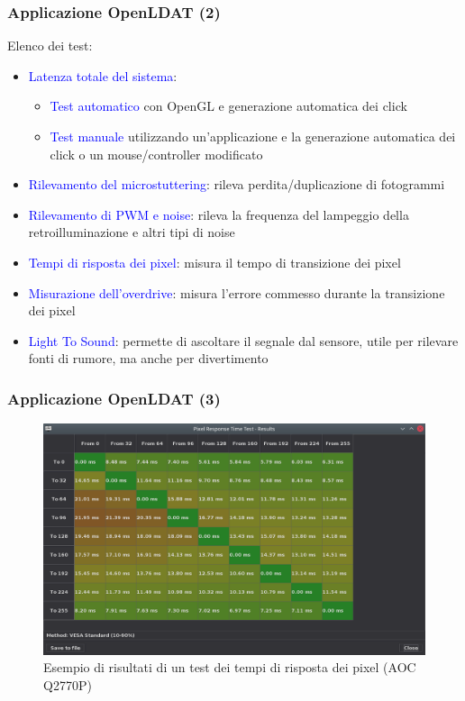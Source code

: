 \documentclass{beamer}
\begin{document}
\begin{frame}[shrink=7]
	\frametitle{Applicazione OpenLDAT (2)}
	Elenco dei test:\begin{itemize}
		\item \textcolor{blue}{Latenza totale del sistema}:\begin{itemize}
			\item \textcolor{blue}{Test automatico} con OpenGL e generazione automatica dei click
			\item \textcolor{blue}{Test manuale} utilizzando un'applicazione e la generazione automatica dei click o un mouse/controller modificato
		\end{itemize}
		\item \textcolor{blue}{Rilevamento del microstuttering}: rileva perdita/duplicazione di fotogrammi
		\item \textcolor{blue}{Rilevamento di PWM e noise}: rileva la frequenza del lampeggio della retroilluminazione e altri tipi di noise
		\item \textcolor{blue}{Tempi di risposta dei pixel}: misura il tempo di transizione dei pixel
		\item \textcolor{blue}{Misurazione dell'overdrive}: misura l'errore commesso durante la transizione dei pixel
		\item \textcolor{blue}{Light To Sound}: permette di ascoltare il segnale dal sensore, utile per rilevare fonti di rumore, ma anche per divertimento
	\end{itemize}
\end{frame}
\begin{frame}
	\frametitle{Applicazione OpenLDAT (3)}
	\begin{figure}
		\includegraphics[width=\textwidth]{Applicazione_files/gui_pixelresponse_results.png}
		\caption*{Esempio di risultati di un test dei tempi di risposta dei pixel (AOC Q2770P)}
	\end{figure}
\end{frame}
\end{document}
